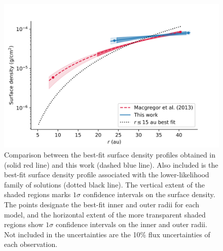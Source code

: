 \documentclass[modern]{aastex62}
\begin{document}
\begin{figure}
  \includegraphics[width=\linewidth]{../figures/surface_density}
  \caption{
    Comparison between the best-fit surface density profiles obtained in \cite{macgregor13} (solid red line) and this work (dashed blue line).
    Also included is the best-fit surface density profile associated with the lower-likelihood family of solutions (dotted black line).
    The vertical extent of the shaded regions marks $1\sigma$ confidence intervals on the surface density. 
    The points designate the best-fit inner and outer radii for each model, and the horizontal extent of the more transparent shaded regions show $1 \sigma$ confidence intervals on the inner and outer radii.
    Not included in the uncertainties are the 10\% flux uncertainties of each observation.
    }
  \label{fig surface_density}
\end{figure}
\end{document}
